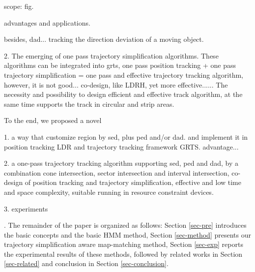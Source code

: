 scope: fig.

advantages and applications.

besides, dad... tracking the direction deviation of a moving object.


2. The emerging of one pass trajectory simplification algorithms. These algorithms can be integrated into grts, one pass position tracking + one pass trajectory simplification = one pass and effective trajectory tracking algorithm, however, it is not good... co-design, like LDRH, yet more effective...... 
The necessity and possibility to design efficient and effective track algorithm, at the same time supports the track in circular and strip areas.

To the end, we proposed a novel 

1. a way that customize region by sed, plus ped and/or dad. and implement it in position tracking LDR and trajectory tracking framework GRTS. advantage...

2. a one-pass trajectory tracking algorithm supporting sed, ped and dad, by a combination cone intersection, sector intersection and interval intersection, \ie co-design of position tracking and trajectory simplification, effective and low time and space complexity, suitable running in resource constraint devices.

3. experiments

.
The remainder of the paper is organized as follows:
Section \ref{sec-pre} introduces the basic concepts and the basic HMM method,
Section \ref{sec-method} presents our trajectory simplification aware map-matching method,
Section \ref{sec-exp} reports the experimental results of these methods, followed by related works in Section \ref{sec-related} and conclusion in Section \ref{sec-conclusion}.




